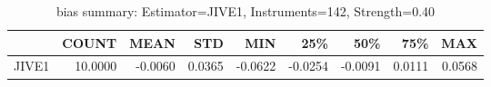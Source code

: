\begin{table}[ht]
\centering
\caption{bias summary: Estimator=JIVE1, Instruments=142, Strength=0.40}
\begin{tabular}{lrrrrrrrr}
\toprule
 & COUNT & MEAN & STD & MIN & 25\% & 50\% & 75\% & MAX \\
\midrule
JIVE1 & 10.0000 & -0.0060 & 0.0365 & -0.0622 & -0.0254 & -0.0091 & 0.0111 & 0.0568 \\
\bottomrule
\end{tabular}
\end{table}
